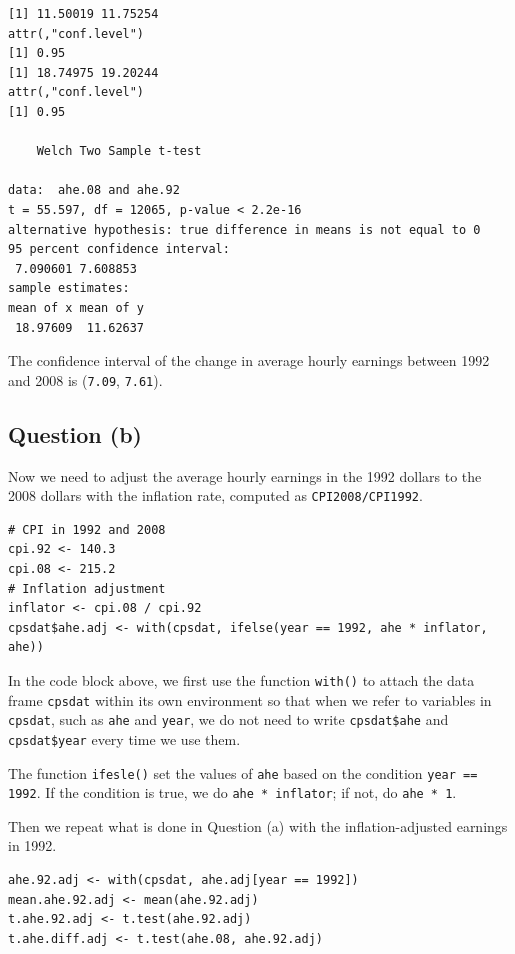 \documentclass[a4paper,11pt]{article}
\begin{document}
\begin{itemize}
\begin{verbatim}
[1] 11.50019 11.75254
attr(,"conf.level")
[1] 0.95
[1] 18.74975 19.20244
attr(,"conf.level")
[1] 0.95

	Welch Two Sample t-test

data:  ahe.08 and ahe.92
t = 55.597, df = 12065, p-value < 2.2e-16
alternative hypothesis: true difference in means is not equal to 0
95 percent confidence interval:
 7.090601 7.608853
sample estimates:
mean of x mean of y
 18.97609  11.62637
\end{verbatim}

The confidence interval of the change in average hourly earnings
between 1992 and 2008 is (\texttt{7.09},
\texttt{7.61}).
\end{itemize}

\subsection*{Question (b)}
\label{sec:org4df623c}

Now we need to adjust the average hourly earnings in the 1992 dollars
to the 2008 dollars with the inflation rate, computed as
\texttt{CPI2008/CPI1992}.

\begin{verbatim}
# CPI in 1992 and 2008
cpi.92 <- 140.3
cpi.08 <- 215.2
# Inflation adjustment
inflator <- cpi.08 / cpi.92
cpsdat$ahe.adj <- with(cpsdat, ifelse(year == 1992, ahe * inflator, ahe))
\end{verbatim}

In the code block above, we first use the function \texttt{with()} to attach
the data frame \texttt{cpsdat} within its own environment so that when we
refer to variables in \texttt{cpsdat}, such as \texttt{ahe} and \texttt{year}, we do not
need to write \texttt{cpsdat\$ahe} and \texttt{cpsdat\$year} every time we use
them.

The function \texttt{ifesle()} set the values of \texttt{ahe} based on the
condition \texttt{year == 1992}. If the condition is true, we do \texttt{ahe *
inflator}; if not, do \texttt{ahe * 1}.

Then we repeat what is done in Question (a) with the
inflation-adjusted earnings in 1992.

\begin{verbatim}
ahe.92.adj <- with(cpsdat, ahe.adj[year == 1992])
mean.ahe.92.adj <- mean(ahe.92.adj)
t.ahe.92.adj <- t.test(ahe.92.adj)
t.ahe.diff.adj <- t.test(ahe.08, ahe.92.adj)
\end{verbatim}
\end{document}
